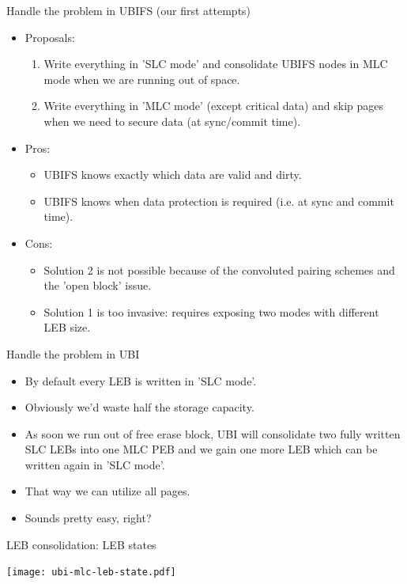 \documentclass[aspectratio=169,obeyspaces,spaces,hyphens,dvipsnames]{beamer}
\begin{document}
\begin{frame}{Handle the problem in UBIFS (our first attempts)}
  \begin{itemize}
  \item Proposals:
    \begin{enumerate}
    \item Write everything in 'SLC mode' and consolidate UBIFS nodes in MLC
	  mode when we are running out of space.
    \item Write everything in 'MLC mode' (except critical data) and skip
	  pages when we need to secure data (at sync/commit time).
    \end{enumerate}
  \item Pros:
    \begin{itemize}
    \item UBIFS knows exactly which data are valid and dirty.
    \item UBIFS knows when data protection is required (i.e. at sync and commit
	  time).
    \end{itemize}
  \item Cons:
    \begin{itemize}
    \item Solution 2 is not possible because of the convoluted pairing schemes
	  and the 'open block' issue.
    \item Solution 1 is too invasive: requires exposing two modes with different
	  LEB size.
    \end{itemize}
  \end{itemize}
\end{frame}

\begin{frame}{Handle the problem in UBI}
  \begin{itemize}
  \item By default every LEB is written in 'SLC mode'.
  \item Obviously we'd waste half the storage capacity.
  \item As soon we run out of free erase block, UBI will consolidate
	two fully written SLC LEBs into one MLC PEB and we gain one
	more LEB which can be written again in 'SLC mode'.
  \item That way we can utilize all pages.
  \item Sounds pretty easy, right?
  \end{itemize}
\end{frame}

\begin{frame}{LEB consolidation: LEB states}
  \begin{center}
    \texttt{[image: ubi-mlc-leb-state.pdf]}
  \end{center}
\end{frame}
\end{document}
